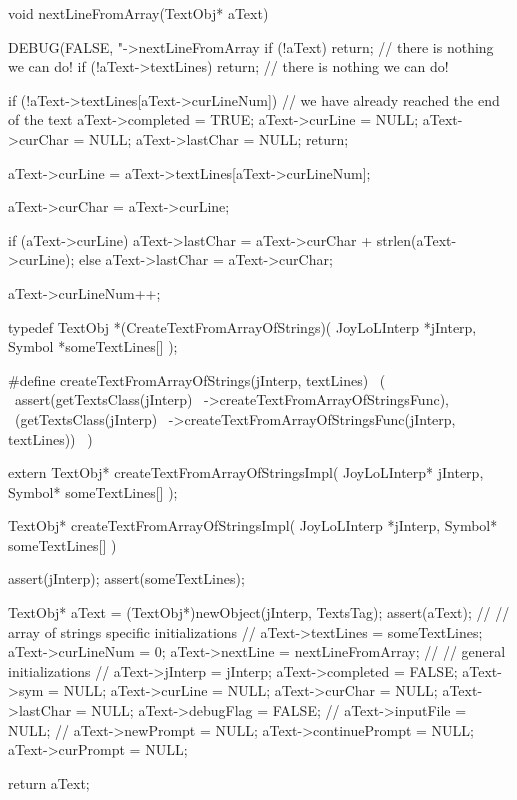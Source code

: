 \startCCode
void nextLineFromArray(TextObj* aText) {
  DEBUG(FALSE, "->nextLineFromArray %
  if (!aText) return;  // there is nothing we can do!
  if (!aText->textLines) return; // there is nothing we can do!

  if (!aText->textLines[aText->curLineNum]) {
    // we have already reached the end of the text
    aText->completed  = TRUE;
    aText->curLine    = NULL;
    aText->curChar    = NULL;
    aText->lastChar   = NULL;
    return;
  }

  aText->curLine  = aText->textLines[aText->curLineNum];

  aText->curChar  = aText->curLine;

  if (aText->curLine) {
    aText->lastChar = aText->curChar + strlen(aText->curLine);
  } else aText->lastChar = aText->curChar;

  aText->curLineNum++;
}
\stopCCode

\startCHeader
typedef TextObj *(CreateTextFromArrayOfStrings)(
  JoyLoLInterp *jInterp,
  Symbol       *someTextLines[]
);

#define createTextFromArrayOfStrings(jInterp, textLines)      \
  (                                                           \
    assert(getTextsClass(jInterp)                             \
      ->createTextFromArrayOfStringsFunc),                    \
    (getTextsClass(jInterp)                                   \
      ->createTextFromArrayOfStringsFunc(jInterp, textLines)) \
  )
\stopCHeader

\setCHeaderStream{private}
\startCHeader
extern TextObj* createTextFromArrayOfStringsImpl(
  JoyLoLInterp* jInterp,
  Symbol* someTextLines[]
);
\stopCHeader
{}

\startCCode
TextObj* createTextFromArrayOfStringsImpl(
  JoyLoLInterp *jInterp,
  Symbol* someTextLines[]
) {
  assert(jInterp);
  assert(someTextLines);
  
  TextObj* aText = (TextObj*)newObject(jInterp, TextsTag);
  assert(aText);
  //
  // array of strings specific initializations
  //
  aText->textLines  = someTextLines;
  aText->curLineNum = 0;
  aText->nextLine   = nextLineFromArray;
  //
  // general initializations
  //
  aText->jInterp    = jInterp;
  aText->completed  = FALSE;
  aText->sym        = NULL;
  aText->curLine    = NULL;
  aText->curChar    = NULL;
  aText->lastChar   = NULL;
  aText->debugFlag  = FALSE;
  //
  aText->inputFile  = NULL;
  //
  aText->newPrompt       = NULL;
  aText->continuePrompt  = NULL;
  aText->curPrompt       = NULL;

  return aText;
}
\stopCCode

